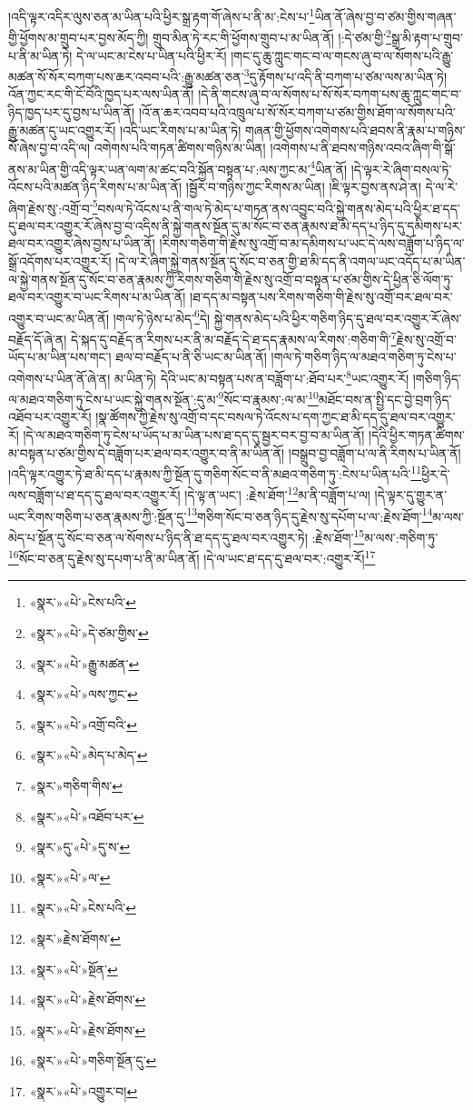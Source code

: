 །འདི་ལྟར་འདིར་ལུས་ཅན་མ་ཡིན་པའི་ཕྱིར་སྒྲ་རྟག་གོ་ཞེས་པ་ནི་མ་:ངེས་པ་\footnote{«སྣར་»«པེ་»ངེས་པའི་}ཡིན་ནོ་ཞེས་བྱ་བ་ཙམ་གྱིས་གཞན་གྱི་ཕྱོགས་མ་གྲུབ་པར་བྱས་མོད་ཀྱི། གྲུབ་མིན་ཏེ་རང་གི་ཕྱོགས་གྲུབ་པ་མ་ཡིན་ནོ། །:དེ་ཙམ་གྱི་\footnote{«སྣར་»«པེ་»དེ་ཙམ་གྱིས་}སྒྲ་མི་རྟག་པ་གྲུབ་པ་ནི་མ་ཡིན་ཏེ། དེ་ལ་ཡང་མ་ངེས་པ་ཡིན་པའི་ཕྱིར་རོ། །གང་དུ་ཆུ་ཀླུང་གང་བ་ལ་གངས་ཞུ་བ་ལ་སོགས་པའི་རྒྱུ་མཚན་སོ་སོར་བཀག་པས་ཆར་འབབ་པའི་:རྒྱུ་མཚན་ཅན་\footnote{«སྣར་»«པེ་»རྒྱུ་མཚན་}དུ་རྟོགས་པ་འདི་ནི་བཀག་པ་ཙམ་ལས་མ་ཡིན་ཏེ། འོན་ཀྱང་རང་གི་ངོ་བོའི་ཁྱད་པར་ལས་ཡིན་ནོ། །དེ་ནི་གངས་ཞུ་བ་ལ་སོགས་པ་སོ་སོར་བཀག་པས་ཆུ་ཀླུང་གང་བ་ཉིད་ཁྱད་པར་དུ་བྱས་པ་ཡིན་ནོ། །འོ་ན་ཆར་འབབ་པའི་འཁྲུལ་པ་སོ་སོར་བཀག་པ་ཙམ་གྱིས་ཐོག་ལ་སོགས་པའི་རྒྱུ་མཚན་དུ་ཡང་འགྱུར་རོ། །འདི་ཡང་རིགས་པ་མ་ཡིན་ཏེ། གཞན་གྱི་ཕྱོགས་འགེགས་པའི་ཐབས་ནི་རྣམ་པ་གཉིས་སོ་ཞེས་བྱ་བ་འདི་ལ། འགེགས་པའི་གཏན་ཚིགས་གཉིས་མ་ཡིན། །འགེགས་པ་ནི་ཐབས་གཉིས་འབའ་ཞིག་གི་སྒོ་ནས་མ་ཡིན་གྱི་འདི་ལྟར་ཡན་ལག་མ་ཚང་བའི་སྐྱོན་བསྟན་པ་:ལས་ཀྱང་མ་\footnote{«སྣར་»«པེ་»ལས་ཀྱང་}ཡིན་ནོ། །དེ་ལྟར་རེ་ཞིག་བསལ་ཏེ་འོངས་པའི་མཚན་ཉིད་རིགས་པ་མ་ཡིན་ནོ། །སྦྱོར་བ་གཉིས་ཀྱང་རིགས་མ་ཡིན། །ཇི་ལྟར་བྱས་ནས་ཤེ་ན། དེ་ལ་རེ་ཞིག་རྗེས་སུ་:འགྲོ་བ་\footnote{«སྣར་»«པེ་»འགྲོ་བའི་}བསལ་ཏེ་འོངས་པ་ནི་གལ་ཏེ་མེད་པ་གཏན་ནས་འབྱུང་བའི་སྐྱེ་གནས་མེད་པའི་ཕྱིར་ཐ་དད་དུ་ཐལ་བར་འགྱུར་རོ་ཞེས་བྱ་བ་འདིས་ནི་སྐྱེ་གནས་སྔོན་དུ་མ་སོང་བ་ཅན་རྣམས་ཐ་མི་དད་པ་ཉིད་དུ་དམིགས་པར་ཐལ་བར་འགྱུར་ཞེས་བྱས་པ་ཡིན་ནོ། །རིགས་གཅིག་གི་རྗེས་སུ་འགྲོ་བ་མ་དམིགས་པ་ཡང་དེ་ལས་བཟློག་པ་ཉིད་ལ་སྒྲོ་འདོགས་པར་འགྱུར་རོ། །དེ་ལ་རེ་ཞིག་སྐྱེ་གནས་སྔོན་དུ་སོང་བ་ཅན་གྱི་ཐ་མི་དད་ནི་འགལ་ཡང་འདོད་པ་མ་ཡིན་ལ་སྐྱེ་གནས་སྔོན་དུ་སོང་བ་ཅན་རྣམས་ཀྱི་རིགས་གཅིག་གི་རྗེས་སུ་འགྲོ་བ་བསྟན་པ་ཙམ་གྱིས་དེ་ཕྱིན་ཅི་ལོག་ཏུ་ཐལ་བར་འགྱུར་བ་ཡང་རིགས་པ་མ་ཡིན་ནོ། །ཐ་དད་མ་བསྟན་པས་རིགས་གཅིག་གི་རྗེས་སུ་འགྲོ་བར་ཐལ་བར་འགྱུར་བ་ཡང་མ་ཡིན་ནོ། །གལ་ཏེ་ཉེས་པ་མེད་\footnote{«སྣར་»«པེ་»མེད་པ་མེད་}དེ། སྐྱེ་གནས་མེད་པའི་ཕྱིར་གཅིག་ཉིད་དུ་ཐལ་བར་འགྱུར་རོ་ཞེས་བརྗོད་དོ་ཞེ་ན། དེ་སྐད་དུ་བརྗོད་ན་རིགས་པར་ནི་མ་བརྗོད་དེ་ཐ་དད་རྣམས་ལ་རིགས་:གཅིག་གི་\footnote{«སྣར་»གཅིག་གིས་}རྗེས་སུ་འགྲོ་བ་ཡོད་པ་མ་ཡིན་པས་གང་། ཐལ་བ་བརྗོད་པ་ནི་ཅི་ཡང་མ་ཡིན་ནོ། །གལ་ཏེ་གཅིག་ཉིད་ལ་མཐའ་གཅིག་ཏུ་ངེས་པ་འགེགས་པ་ཡིན་ནོ་ཞེ་ན། མ་ཡིན་ཏེ། དེའི་ཡང་མ་བསྟན་པས་ན་བཟློག་པ་:ཐོབ་པར་\footnote{«སྣར་»«པེ་»འཐོབ་པར་}ཡང་འགྱུར་རོ། །གཅིག་ཉིད་ལ་མཐའ་གཅིག་ཏུ་ངེས་པ་ཡང་སྐྱེ་གནས་སྔོན་:དུ་མ་\footnote{«སྣར་»དུ་«པེ་»དུ་ས་}སོང་བ་རྣམས་:ལ་མ་\footnote{«སྣར་»«པེ་»ལ་}མཐོང་བས་ན་སྤྱི་དང་བྱེ་བྲག་ཉིད་འཐོབ་པར་འགྱུར་རོ། །སྣ་ཚོགས་ཀྱི་རྗེས་སུ་འགྲོ་བ་དང་བསལ་ཏེ་འོངས་པ་དག་ཀྱང་ཐ་མི་དད་དུ་ཐལ་བར་འགྱུར་རོ། །དེ་ལ་མཐའ་གཅིག་ཏུ་ངེས་པ་ཡོད་པ་མ་ཡིན་པས་ཐ་དད་དུ་སྦྱར་བར་བྱ་བ་མ་ཡིན་ནོ། །དེའི་ཕྱིར་གཏན་ཚིགས་མ་བསྟན་པ་ཙམ་གྱིས་དེ་བཟློག་པར་ཐལ་བར་འགྱུར་བ་ནི་མ་ཡིན་ནོ། །བསྒྲུབ་བྱ་བཟློག་པ་ལ་ནི་རིགས་པ་ཡིན་ནོ། །འདི་ལྟར་འགྱུར་ཏེ་ཐ་མི་དད་པ་རྣམས་ཀྱི་སྔོན་དུ་གཅིག་སོང་བ་ནི་མཐའ་གཅིག་ཏུ་:ངེས་པ་ཡིན་པའི་\footnote{«སྣར་»«པེ་»ངེས་པའི་}ཕྱིར་དེ་ལས་བཟློག་པ་ཐ་དད་དུ་ཐལ་བར་འགྱུར་རོ། །དེ་ལྟ་ན་ཡང་། :རྗེས་ཐོག་\footnote{«སྣར་»རྗེས་ཐོགས་}མ་ནི་བཟློག་པ་ལ། །དེ་ལྟར་དུ་གྱུར་ན་ཡང་རིགས་གཅིག་པ་ཅན་རྣམས་ཀྱི་:སྔོན་དུ་\footnote{«སྣར་»«པེ་»སྔོན་}གཅིག་སོང་བ་ཅན་ཉིད་དུ་རྗེས་སུ་དཔོག་པ་ལ་:རྗེས་ཐོག་\footnote{«སྣར་»«པེ་»རྗེས་ཐོགས་}མ་ལས་མེད་པ་སྔོན་དུ་སོང་བ་ཅན་ལ་སོགས་པ་ཉིད་ནི་ཐ་དད་དུ་ཐལ་བར་འགྱུར་ཏེ། :རྗེས་ཐོག་\footnote{«སྣར་»«པེ་»རྗེས་ཐོགས་}མ་ལས་:གཅིག་ཏུ་\footnote{«སྣར་»«པེ་»གཅིག་སྔོན་དུ་}སོང་བ་ཅན་དུ་རྗེས་སུ་དཔག་པ་ནི་མ་ཡིན་ནོ། །དེ་ལ་ཡང་ཐ་དད་དུ་ཐལ་བར་:འགྱུར་རོ།\footnote{«སྣར་»«པེ་»འགྱུར་བ།} 